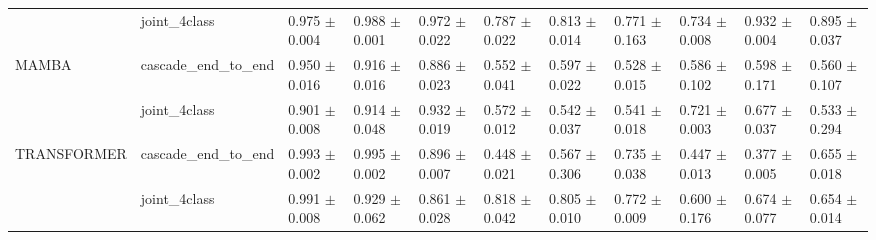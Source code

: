 \begin{table}
\begin{tabular}{lllllllllll}
            & joint_4class &  0.975 $\pm$ 0.004 &  0.988 $\pm$ 0.001 &  0.972 $\pm$ 0.022 &  0.787 $\pm$ 0.022 &  0.813 $\pm$ 0.014 &  0.771 $\pm$ 0.163 &  0.734 $\pm$ 0.008 &  0.932 $\pm$ 0.004 &  0.895 $\pm$ 0.037 \\
MAMBA & cascade_end_to_end &  0.950 $\pm$ 0.016 &  0.916 $\pm$ 0.016 &  0.886 $\pm$ 0.023 &  0.552 $\pm$ 0.041 &  0.597 $\pm$ 0.022 &  0.528 $\pm$ 0.015 &  0.586 $\pm$ 0.102 &  0.598 $\pm$ 0.171 &  0.560 $\pm$ 0.107 \\
            & joint_4class &  0.901 $\pm$ 0.008 &  0.914 $\pm$ 0.048 &  0.932 $\pm$ 0.019 &  0.572 $\pm$ 0.012 &  0.542 $\pm$ 0.037 &  0.541 $\pm$ 0.018 &  0.721 $\pm$ 0.003 &  0.677 $\pm$ 0.037 &  0.533 $\pm$ 0.294 \\
TRANSFORMER & cascade_end_to_end &  0.993 $\pm$ 0.002 &  0.995 $\pm$ 0.002 &  0.896 $\pm$ 0.007 &  0.448 $\pm$ 0.021 &  0.567 $\pm$ 0.306 &  0.735 $\pm$ 0.038 &  0.447 $\pm$ 0.013 &  0.377 $\pm$ 0.005 &  0.655 $\pm$ 0.018 \\
            & joint_4class &  0.991 $\pm$ 0.008 &  0.929 $\pm$ 0.062 &  0.861 $\pm$ 0.028 &  0.818 $\pm$ 0.042 &  0.805 $\pm$ 0.010 &  0.772 $\pm$ 0.009 &  0.600 $\pm$ 0.176 &  0.674 $\pm$ 0.077 &  0.654 $\pm$ 0.014 \\
\bottomrule
\end{tabular}
\end{table}
